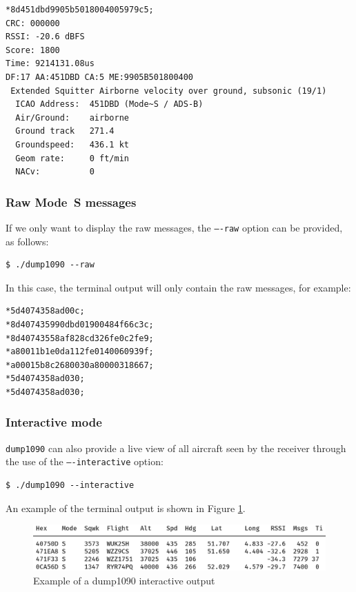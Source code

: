 \begin{verbatim}
*8d451dbd9905b5018004005979c5;
CRC: 000000
RSSI: -20.6 dBFS
Score: 1800
Time: 9214131.08us
DF:17 AA:451DBD CA:5 ME:9905B501800400
 Extended Squitter Airborne velocity over ground, subsonic (19/1)
  ICAO Address:  451DBD (Mode~S / ADS-B)
  Air/Ground:    airborne
  Ground track   271.4
  Groundspeed:   436.1 kt
  Geom rate:     0 ft/min
  NACv:          0
\end{verbatim}

\subsubsection{Raw Mode~S messages}

If we only want to display the  raw messages, the \texttt{----raw} option can be provided, as follows:

\begin{verbatim}
$ ./dump1090 --raw
\end{verbatim}

In this case, the terminal output will only contain the raw messages, for example:

\begin{verbatim}
*5d4074358ad00c;
*8d407435990dbd01900484f66c3c;
*8d40743558af828cd326fe0c2fe9;
*a80011b1e0da112fe0140060939f;
*a00015b8c2680030a80000318667;
*5d4074358ad030;
*5d4074358ad030;
\end{verbatim}

\subsubsection{Interactive mode}

\texttt{dump1090} can also provide a live view of all aircraft seen by the receiver through the use of the \texttt{----interactive} option:

\begin{verbatim}
$ ./dump1090 --interactive
\end{verbatim}

An example of the terminal output is shown in Figure \ref{fig:dump1090}.

\begin{figure}[ht]
  \centering
  \includegraphics[scale=0.33]{figures/quickstart/dump1090.png}
  \caption{Example of a dump1090 interactive output}
  \label{fig:dump1090}
\end{figure}


